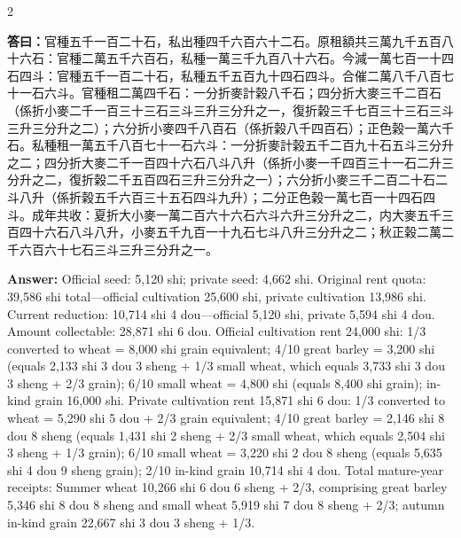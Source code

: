 \documentclass[11pt,a4paper]{article}
\newcommand{\AnswerText}[1]{\par\noindent\textbf{\color{answercolor}答曰：}#1\par}
\newcommand{\AnswerEn}[1]{\par\noindent\textbf{\color{answercolor}Answer:} #1\par}
\begin{document}
\begin{paracol}{2}
\AnswerText{官種五千一百二十石，私出種四千六百六十二石。原租額共三萬九千五百八十六石：官種二萬五千六百石，私種一萬三千九百八十六石。今減一萬七百一十四石四斗：官種五千一百二十石，私種五千五百九十四石四斗。合催二萬八千八百七十一石六斗。官種租二萬四千石：一分折麥計榖八千石；四分折大麥三千二百石（係折小麥二千一百三十三石三斗三升三分升之一，復折榖三千七百三十三石三斗三升三分升之二）；六分折小麥四千八百石（係折榖八千四百石）；正色榖一萬六千石。私種租一萬五千八百七十一石六斗：一分折麥計榖五千二百九十石五斗三分升之二；四分折大麥二千一百四十六石八斗八升（係折小麥一千四百三十一石二升三分升之二，復折榖二千五百四石三升三分升之一）；六分折小麥三千二百二十石二斗八升（係折榖五千六百三十五石四斗九升）；二分正色榖一萬七百一十四石四斗。成年共收：夏折大小麥一萬二百六十六石六斗六升三分升之二，内大麥五千三百四十六石八斗八升，小麥五千九百一十九石七斗八升三分升之二；秋正榖二萬二千六百六十七石三斗三升三分升之一。}
\switchcolumn
\AnswerEn{Official seed: 5,120 shi; private seed: 4,662 shi. Original rent quota: 39,586 shi total---official cultivation 25,600 shi, private cultivation 13,986 shi. Current reduction: 10,714 shi 4 dou---official 5,120 shi, private 5,594 shi 4 dou. Amount collectable: 28,871 shi 6 dou. Official cultivation rent 24,000 shi: 1/3 converted to wheat = 8,000 shi grain equivalent; 4/10 great barley = 3,200 shi (equals 2,133 shi 3 dou 3 sheng + 1/3 small wheat, which equals 3,733 shi 3 dou 3 sheng + 2/3 grain); 6/10 small wheat = 4,800 shi (equals 8,400 shi grain); in-kind grain 16,000 shi. Private cultivation rent 15,871 shi 6 dou: 1/3 converted to wheat = 5,290 shi 5 dou + 2/3 grain equivalent; 4/10 great barley = 2,146 shi 8 dou 8 sheng (equals 1,431 shi 2 sheng + 2/3 small wheat, which equals 2,504 shi 3 sheng + 1/3 grain); 6/10 small wheat = 3,220 shi 2 dou 8 sheng (equals 5,635 shi 4 dou 9 sheng grain); 2/10 in-kind grain 10,714 shi 4 dou. Total mature-year receipts: Summer wheat 10,266 shi 6 dou 6 sheng + 2/3, comprising great barley 5,346 shi 8 dou 8 sheng and small wheat 5,919 shi 7 dou 8 sheng + 2/3; autumn in-kind grain 22,667 shi 3 dou 3 sheng + 1/3.}
\switchcolumn*


\end{paracol}
\end{document}
